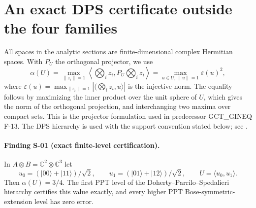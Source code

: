 \section{An exact DPS certificate outside the four families}
\label{sec:dps-example}

All spaces in the analytic sections are finite-dimensional complex
Hermitian spaces. With $P_U$ the orthogonal projector, we use
\[
 \alpha(U)=\max_{\|z_i\|=1}
 \left\langle\bigotimes_i z_i,
 P_U\bigotimes_i z_i\right\rangle
 =\max_{u\in U,\,\|u\|=1}\varepsilon(u)^2,
\]
where $\varepsilon(u)=\max_{\|z_i\|=1}
|\langle\bigotimes_i z_i,u\rangle|$ is the injective norm.
The equality follows by maximizing the inner product over the unit
sphere of $U$, which gives the norm of the orthogonal projection,
and interchanging two maxima over compact sets. This is the
projector formulation used in predecessor GCT\_GINEQ F-13.
The DPS hierarchy is used with the support convention stated below;
see \cite[Section II and Theorem 1, printed p.~7]{DPS}.

\paragraph{Finding S-01 (exact finite-level certification).}
In $A\otimes B=\mathbb C^2\otimes\mathbb C^3$ let
\[
 u_0=(|00\rangle+|11\rangle)/\sqrt2,\qquad
 u_1=(|01\rangle+|12\rangle)/\sqrt2,\qquad U=\langle u_0,u_1\rangle.
\]
Then $\alpha(U)=3/4$. The first PPT level of the
Doherty--Parrilo--Spedalieri hierarchy certifies this value exactly,
and every higher PPT Bose-symmetric-extension level has zero error.

